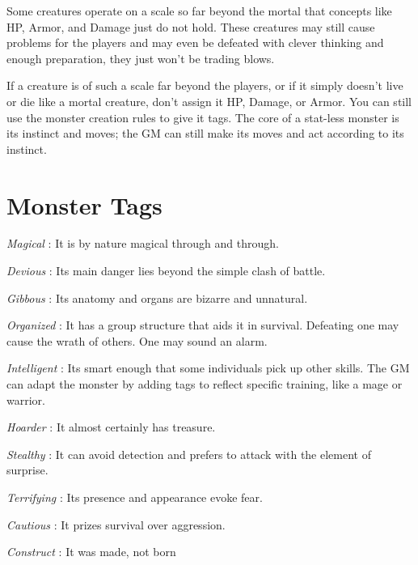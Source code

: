Some creatures operate on a scale so far beyond the mortal that concepts like HP, Armor, and Damage just do not hold. These creatures may still cause problems for the players and may even be defeated with clever thinking and enough preparation, they just won't be trading blows.

 

If a creature is of such a scale far beyond the players, or if it simply doesn't live or die like a mortal creature, don't assign it HP, Damage, or Armor. You can still use the monster creation rules to give it tags. The core of a stat-less monster is its instinct and moves; the GM can still make its moves and act according to its instinct.

 
\section{Monster Tags}    
 

{\em Magical} : It is by nature magical through and through.

 

{\em Devious} : Its main danger lies beyond the simple clash of battle.

 

{\em Gibbous} : Its anatomy and organs are bizarre and unnatural.

 

{\em Organized} : It has a group structure that aids it in survival. Defeating one may cause the wrath of others. One may sound an alarm.

 

{\em Intelligent} : Its smart enough that some individuals pick up other skills. The GM can adapt the monster by adding tags to reflect specific training, like a mage or warrior.

 

{\em Hoarder} : It almost certainly has treasure.

 

{\em Stealthy} : It can avoid detection and prefers to attack with the element of surprise.

 

{\em Terrifying} : Its presence and appearance evoke fear.

 

{\em Cautious} : It prizes survival over aggression.

 

{\em Construct} : It was made, not born

